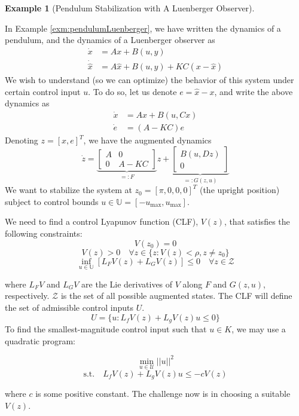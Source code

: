\documentclass[
]{book}
\theoremstyle{definition}
\theoremstyle{definition}
\newtheorem{example}{Example}[chapter]
\theoremstyle{definition}
\theoremstyle{definition}
\theoremstyle{remark}
\begin{document}
\begin{example}[Pendulum Stabilization with A Luenberger Observer]
\protect\hypertarget{exm:pendulumLuenbergerFeedback}{}\label{exm:pendulumLuenbergerFeedback}

In Example \ref{exm:pendulumLuenberger}, we have written the dynamics of a pendulum, and the dynamics of a Luenberger observer as
\begin{align}
\dot{x} &= A x + B(u,y) \\
\dot{\hat{x}} &= A \hat{x} + B(u,y) + KC (x - \hat{x})
\end{align}
We wish to understand (so we can optimize) the behavior of this system under certain control input \(u\). To do so, let us denote \(e = \hat{x} - x\), and write the above dynamics as
\begin{align}
\dot{x} &= A x + B(u,Cx) \\
\dot{e} & = (A - KC) e
\end{align}
Denoting \(z = [x,e]^T\), we have the augmented dynamics
\[
\dot{z} = \underbrace{\begin{bmatrix} A & 0 \\ 0 & A - KC \end{bmatrix}}_{=:F} z + \underbrace{\begin{bmatrix} B(u,Dz) \\ 0 \end{bmatrix}}_{=:G(z,u)}
\]
We want to stabilize the system at \(z_0 = [\pi,0,0,0]^T\) (the upright position) subject to control bounds \(u \in \mathbb{U} = [-u_{\max},u_{\max}]\).

We need to find a control Lyapunov function (CLF), \(V(z)\), that satisfies the following constraints:
\[
    V(z_0) = 0
\]
\[
    V(z) > 0 \quad \forall z \in \{z: V(z) < \rho, z \neq z_0 \}
\]
\[
    \inf_{u \in \mathbb{U}} [L_F V(z) + L_G V(z)] \leq 0 \quad \forall z \in \mathcal{Z}
\]

where \(L_F V\) and \(L_G V\) are the Lie derivatives of \(V\) along \(F\) and \(G(z,u)\), respectively. \(\mathcal{Z}\) is the set of all possible augmented states. The CLF will define the set of admissible control inputs \(U\).
\[
    U = \{ u: L_f V(z) + L_g V(z)u \leq 0 \}
\]
To find the smallest-magnitude control input such that \(u \in K\), we may use a quadratic program:

\[
    \min_{u \in \mathcal{U}} ||u||^2
\]
\[
\mathrm{s.t.} \quad L_f V(z) + L_g V(z)u \leq -c V(z)
\]

where \(c\) is some positive constant. The challenge now is in choosing a suitable \(V(z)\).

\end{example}
\end{document}
